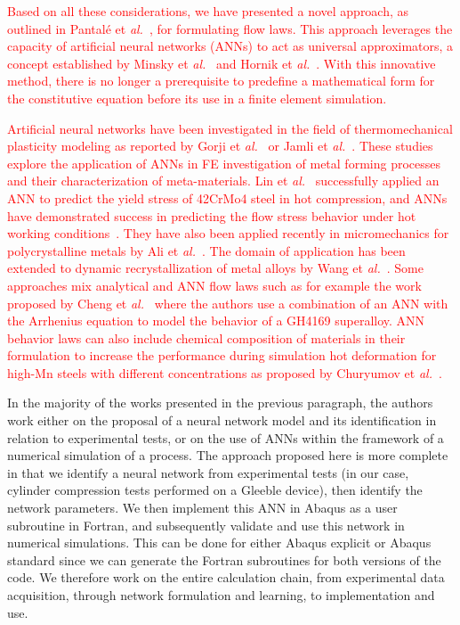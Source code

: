 \documentclass[algorithms,article,submit,pdftex,oneauthors]{Definitions/mdpi}
\makeatletter
\DeclareRobustCommand{\eal}{et \emph{al.}\@\xspace}
\makeatother
\begin{document}
\textcolor{red}{Based on all these considerations, we have presented a novel approach, as outlined in Pantalé \eal~\cite{Pantale-2021-EIN, Pantale-2023-DIA}, for formulating flow laws.
This approach leverages the capacity of artificial neural networks (ANNs) to act as universal approximators, a concept established by Minsky \eal~\cite{Minsky-1969-PIC} and Hornik \eal~\cite{Hornik-1989-MFN}.
With this innovative method, there is no longer a prerequisite to predefine a mathematical form for the constitutive equation before its use in a finite element simulation.}

\textcolor{red}{Artificial neural networks have been investigated in the field of thermomechanical plasticity modeling as reported by Gorji \eal~\cite{Gorji-2020} or Jamli \eal~\cite{Jamli-2019-SNN}.
These studies explore the application of ANNs in FE investigation of metal forming processes and their characterization of meta-materials.
Lin \eal~\cite{Lin-2008} successfully applied an ANN to predict the yield stress of 42CrMo4 steel in hot compression, and ANNs have demonstrated success in predicting the flow stress behavior under hot working conditions~\cite{Stoffel-2018-ANN, Stoffel-2019-NNB}.
They have also been applied recently in micromechanics for polycrystalline metals by Ali \eal~\cite{Ali-2019-AAN}.
The domain of application has been extended to dynamic recrystallization of metal alloys by Wang \eal~\cite{Wang-2021-ANN}.
Some approaches mix analytical and ANN flow laws such as for example the work proposed by Cheng \eal~\cite{Cheng-2022-CWD} where the authors use a combination of an ANN with the Arrhenius equation to model the behavior of a GH4169 superalloy.
ANN behavior laws can also include chemical composition of materials in their formulation to increase the performance during simulation hot deformation for high-Mn steels with different concentrations as proposed by Churyumov \eal~\cite{Churyumov-2023-PTS}.}

In the majority of the works presented in the previous paragraph, the authors work either on the proposal of a neural network model and its identification in relation to experimental tests, or on the use of ANNs within the framework of a numerical simulation of a process.
The approach proposed here is more complete in that we identify a neural network from experimental tests (in our case, cylinder compression tests performed on a Gleeble device), then identify the network parameters.
We then implement this ANN in Abaqus as a user subroutine in Fortran, and subsequently validate and use this network in numerical simulations.
This can be done for either Abaqus explicit or Abaqus standard since we can generate the Fortran subroutines for both versions of the code.
We therefore work on the entire calculation chain, from experimental data acquisition, through network formulation and learning, to implementation and use.
\end{document}
